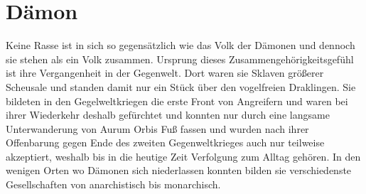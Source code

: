 \documentclass[a4paper,12pt,oneside]{book}
\begin{document}
\section{Dämon}\label{Daemon}
Keine Rasse ist in sich so gegensätzlich wie das Volk der Dämonen und dennoch sie stehen als ein Volk zusammen. Ursprung dieses Zusammengehörigkeitsgefühl ist ihre Vergangenheit in der Gegenwelt. Dort waren sie Sklaven größerer Scheusale und standen damit nur ein Stück über den vogelfreien Draklingen. Sie bildeten in den Gegelweltkriegen die erste Front von Angreifern und waren bei ihrer Wiederkehr deshalb gefürchtet und konnten nur durch eine langsame Unterwanderung von Aurum Orbis Fuß fassen und wurden nach ihrer Offenbarung gegen Ende des zweiten Gegenweltkrieges auch nur teilweise akzeptiert, weshalb bis in die heutige Zeit Verfolgung zum Alltag gehören. In den wenigen Orten wo Dämonen sich niederlassen konnten bilden sie verschiedenste Gesellschaften von anarchistisch bis monarchisch.
\end{document}
